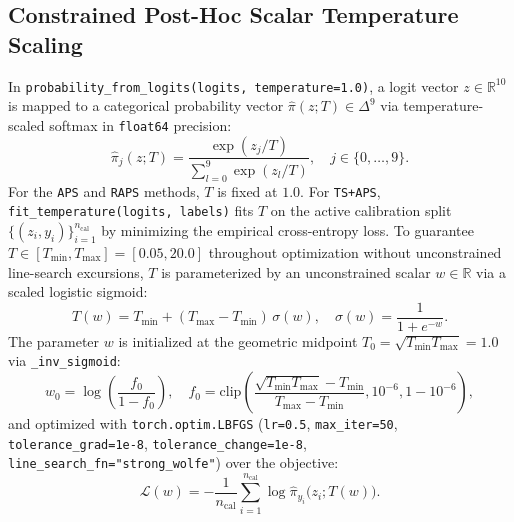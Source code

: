 \documentclass[11pt,a4paper]{article}
\begin{document}
\subsection{Constrained Post-Hoc Scalar Temperature Scaling}
In \texttt{probability\_\allowbreak{}from\_\allowbreak{}logits(logits, temperature=1.0)}, a logit vector $z \in \mathbb{R}^{10}$ is mapped to a categorical probability vector $\hat{\pi}(z; T) \in \Delta^{9}$ via temperature-scaled softmax in \texttt{float64} precision:
\begin{equation}
  \label{eq:temp_softmax}
  \hat{\pi}_j(z; T) = \frac{\exp(z_j / T)}{\sum_{l=0}^{9} \exp(z_l / T)}, \quad j \in \{0, \dots, 9\}.
\end{equation}
For the \texttt{APS} and \texttt{RAPS} methods, $T$ is fixed at $1.0$. For \texttt{TS+APS}, \texttt{fit\_\allowbreak{}temperature(logits, labels)} fits $T$ on the active calibration split $\{(z_i, y_i)\}_{i=1}^{n_{\text{cal}}}$ by minimizing the empirical cross-entropy loss. To guarantee $T \in [T_{\min}, T_{\max}] = [0.05, 20.0]$ throughout optimization without unconstrained line-search excursions, $T$ is parameterized by an unconstrained scalar $w \in \mathbb{R}$ via a scaled logistic sigmoid:
\begin{equation}
  \label{eq:temp_param}
  T(w) = T_{\min} + (T_{\max} - T_{\min}) \, \sigma(w), \quad \sigma(w) = \frac{1}{1 + e^{-w}}.
\end{equation}
The parameter $w$ is initialized at the geometric midpoint $T_0 = \sqrt{T_{\min} T_{\max}} = 1.0$ via \texttt{\_\allowbreak{}inv\_\allowbreak{}sigmoid}:
\begin{equation}
  \label{eq:temp_init}
  w_0 = \log\left(\frac{f_0}{1 - f_0}\right), \quad f_0 = \text{clip}\!\left(\frac{\sqrt{T_{\min} T_{\max}} - T_{\min}}{T_{\max} - T_{\min}}, 10^{-6}, 1 - 10^{-6}\right),
\end{equation}
and optimized with \texttt{torch.optim.LBFGS} (\texttt{lr=0.5}, \texttt{max\_\allowbreak{}iter=50}, \texttt{tolerance\_\allowbreak{}grad=1e-8}, \texttt{tolerance\_\allowbreak{}change=1e-8}, \texttt{line\_\allowbreak{}search\_\allowbreak{}fn="strong\_\allowbreak{}wolfe"}) over the objective:
\begin{equation}
  \label{eq:temp_loss}
  \mathcal{L}(w) = -\frac{1}{n_{\text{cal}}} \sum_{i=1}^{n_{\text{cal}}} \log \hat{\pi}_{y_i}\!\bigl(z_i; T(w)\bigr).
\end{equation}
\end{document}
